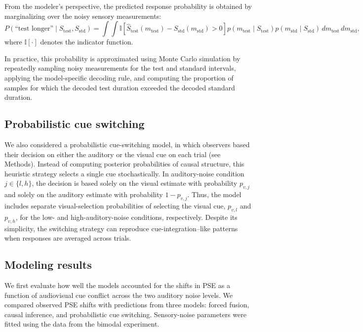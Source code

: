 \documentclass{biorxiv}
\begin{document}
From the modeler's perspective, the predicted response probability is obtained by marginalizing over the noisy sensory measurements:
\begin{equation}
P(\text{``test longer''}\mid S_{\mathrm{test}},S_{\mathrm{std}})
=
\int \int
\mathbb{I}
\!\left[
\hat S_{\mathrm{test}}(m_{\mathrm{test}})
-
\hat S_{\mathrm{std}}(m_{\mathrm{std}})
>0
\right]
p(m_{\mathrm{test}}\mid S_{\mathrm{test}})
p(m_{\mathrm{std}}\mid S_{\mathrm{std}})
\,dm_{\mathrm{test}}\,dm_{\mathrm{std}},
\end{equation}
where $\mathbb{I}[\cdot]$ denotes the indicator function.

In practice, this probability is approximated using Monte Carlo simulation by repeatedly sampling noisy measurements for the test and standard intervals, applying the model-specific decoding rule, and computing the proportion of samples for which the decoded test duration exceeded the decoded standard duration.

\subsection{Probabilistic cue switching}
We also considered a probabilistic cue-switching model, in which observers based their decision on either the auditory or the visual cue on each trial (see Methods). Instead of computing posterior probabilities of causal structure, this heuristic strategy selects a single cue stochastically. In auditory-noise condition $j\in\{l,h\}$, the decision is based solely on the visual estimate with probability $p_{v,j}$ and solely on the auditory estimate with probability $1-p_{v,j}$. Thus, the model includes separate visual-selection probabilities of selecting the visual cue, $p_{v,l}$ and $p_{v,h}$, for the low- and high-auditory-noise conditions, respectively. Despite its simplicity, the switching strategy can reproduce cue-integration--like patterns when responses are averaged across trials.

\subsection{Modeling results}

We first evaluate how well the models accounted for the shifts in PSE as a function of audiovisual cue conflict across the two auditory noise levels. We compared observed PSE shifts with predictions from three models: forced fusion, causal inference, and probabilistic cue switching. Sensory-noise parameters were fitted using the data from the bimodal experiment. 
\end{document}
